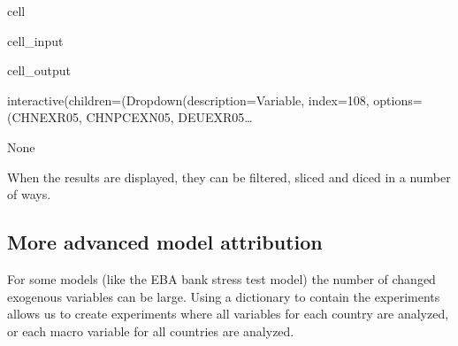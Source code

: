 \documentclass[letterpaper,10pt,english]{jupyterBook}
\begin{document}
\begin{sphinxuseclass}{cell}\begin{sphinxVerbatimInput}

\begin{sphinxuseclass}{cell_input}
\begin{sphinxVerbatim}[commandchars=\\\{\}]
\end{sphinxVerbatim}

\end{sphinxuseclass}\end{sphinxVerbatimInput}
\begin{sphinxVerbatimOutput}

\begin{sphinxuseclass}{cell_output}
\begin{sphinxVerbatim}[commandchars=\\\{\}]
interactive(children=(Dropdown(description=\PYGZsq{}Variable\PYGZsq{}, index=108, options=(\PYGZsq{}CHNEXR05\PYGZsq{}, \PYGZsq{}CHNPCEXN05\PYGZsq{}, \PYGZsq{}DEUEXR05…
\end{sphinxVerbatim}

\begin{sphinxVerbatim}[commandchars=\\\{\}]
None
\end{sphinxVerbatim}

\end{sphinxuseclass}\end{sphinxVerbatimOutput}

\end{sphinxuseclass}
\sphinxAtStartPar
When the results are displayed, they can be filtered, sliced and diced in a number of ways.


\subsection{More advanced model attribution}
\label{\detokenize{content/howto/attribution/Attribution background:more-advanced-model-attribution}}
\sphinxAtStartPar
For some  models (like the EBA bank stress test model) the number of changed exogenous variables can be large. Using a dictionary to contain the experiments allows us to create experiments where all variables for each country are analyzed, or each macro variable for all countries are analyzed.
\end{document}

